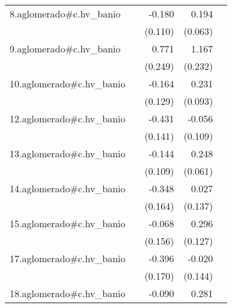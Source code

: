 {\begin{longtable}{l*{4}{D{.}{.}{-1}}}
\addlinespace
8.aglomerado#c.hv\_banio&                     &      -0.180         &       0.194\sym{**} &                     \\
            &                     &     (0.110)         &     (0.063)         &                     \\
\addlinespace
9.aglomerado#c.hv\_banio&                     &       0.771\sym{**} &       1.167\sym{***}&                     \\
            &                     &     (0.249)         &     (0.232)         &                     \\
\addlinespace
10.aglomerado#c.hv\_banio&                     &      -0.164         &       0.231\sym{*}  &                     \\
            &                     &     (0.129)         &     (0.093)         &                     \\
\addlinespace
12.aglomerado#c.hv\_banio&                     &      -0.431\sym{**} &      -0.056         &                     \\
            &                     &     (0.141)         &     (0.109)         &                     \\
\addlinespace
13.aglomerado#c.hv\_banio&                     &      -0.144         &       0.248\sym{***}&                     \\
            &                     &     (0.109)         &     (0.061)         &                     \\
\addlinespace
14.aglomerado#c.hv\_banio&                     &      -0.348\sym{*}  &       0.027         &                     \\
            &                     &     (0.164)         &     (0.137)         &                     \\
\addlinespace
15.aglomerado#c.hv\_banio&                     &      -0.068         &       0.296\sym{*}  &                     \\
            &                     &     (0.156)         &     (0.127)         &                     \\
\addlinespace
17.aglomerado#c.hv\_banio&                     &      -0.396\sym{*}  &      -0.020         &                     \\
            &                     &     (0.170)         &     (0.144)         &                     \\
\addlinespace
18.aglomerado#c.hv\_banio&                     &      -0.090         &       0.281\sym{***}&                     \\

\end{longtable}}
